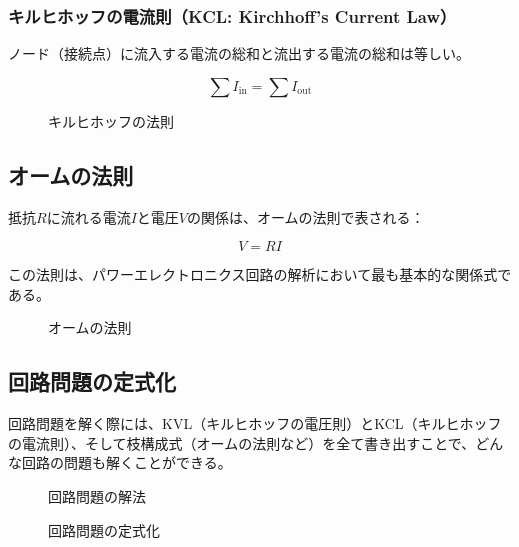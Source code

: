 \subsubsection{キルヒホッフの電流則（KCL: Kirchhoff's Current Law）}

ノード（接続点）に流入する電流の総和と流出する電流の総和は等しい。

\begin{equation}
\sum I_{\text{in}} = \sum I_{\text{out}}
\end{equation}

\begin{figure}[H]
\centering
{}
\caption{キルヒホッフの法則}
\label{fig:kirchhoff}
\end{figure}

\subsection{オームの法則}

抵抗$R$に流れる電流$I$と電圧$V$の関係は、オームの法則で表される：

\begin{equation}
V = RI
\end{equation}

この法則は、パワーエレクトロニクス回路の解析において最も基本的な関係式である。

\begin{figure}[H]
\centering
{}
\caption{オームの法則}
\label{fig:ohms_law}
\end{figure}

\subsection{回路問題の定式化}

回路問題を解く際には、KVL（キルヒホッフの電圧則）とKCL（キルヒホッフの電流則）、そして枝構成式（オームの法則など）を全て書き出すことで、どんな回路の問題も解くことができる。

\begin{figure}[H]
\centering
{}
\caption{回路問題の解法}
\label{fig:circuit_solution}
\end{figure}

\begin{figure}[H]
\centering
{}
\caption{回路問題の定式化}
\label{fig:circuit_formulation}
\end{figure}

